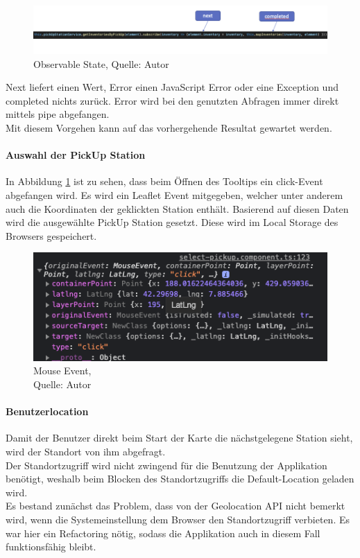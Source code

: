  \begin{figure}[H]
	\centering
	\includegraphics[width=1\textwidth]{images/observable.PNG}
	\caption[Observable States]{Observable State, Quelle: Autor}
	\label{img: observableState}
\end{figure} 

Next liefert einen Wert, Error einen JavaScript Error oder eine Exception und completed nichts zurück. 
Error wird bei den genutzten Abfragen immer direkt mittels pipe abgefangen. \\
Mit diesem Vorgehen kann auf das vorhergehende Resultat gewartet werden.

\paragraph{Auswahl der PickUp Station}
In Abbildung \ref{img: observableState} ist zu sehen, dass beim Öffnen des Tooltips ein click-Event abgefangen wird. Es wird ein Leaflet Event mitgegeben, welcher unter anderem auch die Koordinaten der geklickten Station enthält. Basierend auf diesen Daten wird die ausgewählte PickUp Station gesetzt. Diese wird im Local Storage des Browsers gespeichert. 
 \begin{figure}[H]
	\centering
	\includegraphics[scale=0.5]{images/mouseEvent.PNG}
	\caption[Mouse Event]{Mouse Event,\\ Quelle: Autor}
	\label{img: MouseEvent}
\end{figure} 

\paragraph{Benutzerlocation}
Damit der Benutzer direkt beim Start der Karte die nächstgelegene Station sieht, wird der Standort von ihm abgefragt.\\
Der Standortzugriff wird nicht zwingend für die Benutzung der Applikation benötigt, weshalb beim Blocken des Standortzugriffs die Default-Location geladen wird. \\
Es bestand zunächst das Problem, dass von der Geolocation API nicht bemerkt wird, wenn die Systemeinstellung dem Browser den Standortzugriff verbieten. Es war hier ein Refactoring nötig, sodass die Applikation auch in diesem Fall funktionsfähig bleibt. 

